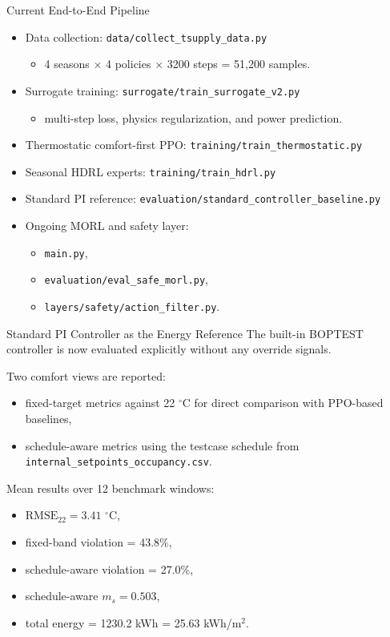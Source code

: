 \documentclass[aspectratio=169,11pt]{beamer}
\newcommand{\degc}{\ensuremath{^\circ\mathrm{C}}}
\begin{document}
\begin{frame}{Current End-to-End Pipeline}
  \begin{itemize}
    \item Data collection: \texttt{data/collect\_tsupply\_data.py}
    \begin{itemize}
      \item 4 seasons $\times$ 4 policies $\times$ 3200 steps = 51,200 samples.
    \end{itemize}
    \item Surrogate training: \texttt{surrogate/train\_surrogate\_v2.py}
    \begin{itemize}
      \item multi-step loss, physics regularization, and power prediction.
    \end{itemize}
    \item Thermostatic comfort-first PPO: \texttt{training/train\_thermostatic.py}
    \item Seasonal HDRL experts: \texttt{training/train\_hdrl.py}
    \item Standard PI reference: \texttt{evaluation/standard\_controller\_baseline.py}
    \item Ongoing MORL and safety layer:
    \begin{itemize}
      \item \texttt{main.py},
      \item \texttt{evaluation/eval\_safe\_morl.py},
      \item \texttt{layers/safety/action\_filter.py}.
    \end{itemize}
  \end{itemize}
\end{frame}

\begin{frame}{Standard PI Controller as the Energy Reference}
  The built-in BOPTEST controller is now evaluated explicitly without any override signals.

  \vspace{0.5em}
  Two comfort views are reported:
  \begin{itemize}
    \item fixed-target metrics against 22 \degc{} for direct comparison with PPO-based baselines,
    \item schedule-aware metrics using the testcase schedule from \texttt{internal\_setpoints\_occupancy.csv}.
  \end{itemize}

  \vspace{0.5em}
  Mean results over 12 benchmark windows:
  \begin{itemize}
    \item $\mathrm{RMSE}_{22} = 3.41$ \degc{},
    \item fixed-band violation = 43.8\%,
    \item schedule-aware violation = 27.0\%,
    \item schedule-aware $m_s = 0.503$,
    \item total energy = 1230.2 kWh = 25.63 kWh/m$^2$.
  \end{itemize}
\end{frame}
\end{document}
